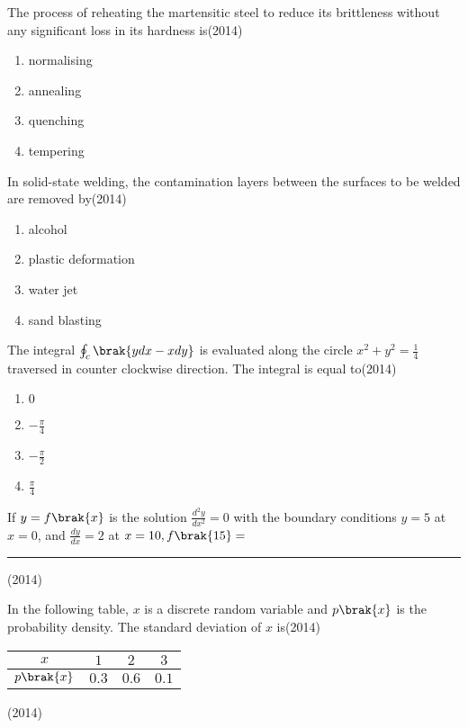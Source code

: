 \item The process of reheating the martensitic steel to reduce its brittleness without any significant loss in its hardness is\hfill(2014)
\begin{multicols}{2}
\begin{enumerate}
\item normalising
\item annealing
\item quenching
\item tempering
\end{enumerate}
\end{multicols}


\item In solid-state welding, the contamination layers between the surfaces to be welded are removed by\hfill(2014)
\begin{multicols}{2}
\begin{enumerate}
\item alcohol
\item plastic deformation
\item water jet
\item sand blasting
\end{enumerate}
\end{multicols}


\item The integral $\oint_{c}\brak{ydx-xdy}$ is evaluated along the circle $x^{2}+y^{2}=\frac{1}{4}$ traversed in counter clockwise direction. The integral is equal to\hfill(2014)
\begin{multicols}{2}
\begin{enumerate}
\item $0$
\item $-\frac{\pi}{4}$
\item $-\frac{\pi}{2}$
\item $\frac{\pi}{4}$
\end{enumerate}
\end{multicols}


\item If $y=f\brak{x}$ is the solution $\frac{d^{2}y}{dx^{2}}=0$ with the boundary conditions $y=5$ at $x=0$, and $\frac{dy}{dx}=2$ at $x=10,f\brak{15}=$ \rule{1cm}{0.15mm}\hfill(2014)


\item In the following table, $x$ is a discrete random variable and $p\brak{x}$ is the probability density. The standard deviation of $x$ is\hfill(2014)


\begin{table}[h!]
\renewcommand{\thetable}{1}
    \centering
   \begin{tabular}{|c|c|c|c|}
\hline
\textbf{$x$} & $1$ & $2$ & $3$ \\
\hline
\textbf{$p\brak{x}$} & $0.3$ & $0.6$ &$0.1$\\
\hline
\end{tabular}
   \def\tablename{Table}
\end{table}\hfill(2014)


